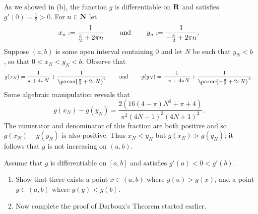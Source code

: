 \documentclass{lew98_solutions}
\begin{document}
\begin{solution}
    As we showed in  (b), the function \( g \) is differentiable on \( \mathbf{R} \) and satisfies \( g'(0) = \tfrac{1}{2} > 0 \). For \( n \in \mathbf{N} \) let
    \[
        x_n := \frac{1}{\tfrac{\pi}{2} + 2 \pi n} \hspace{8mm} \text{and} \hspace{8mm} y_n := \frac{1}{-\tfrac{\pi}{2} + 2 \pi n}.
    \]
    Suppose \( (a, b) \) is some open interval containing 0 and let \( N \) be such that \( y_N < b \), so that \( 0 < x_N < y_N < b \). Observe that
    \[
        g(x_N) = \frac{1}{\pi + 4 \pi N} + \frac{1}{\paren{ \tfrac{\pi}{2} + 2 \pi N }^2} \hspaceand g(y_N) = \frac{1}{-\pi + 4 \pi N} + \frac{1}{\paren{ -\tfrac{\pi}{2} + 2 \pi N }^2}.
    \]
    Some algebraic manipulation reveals that
    \[
        g(x_N) - g(y_N) = \frac{2(16(4 - \pi) N^2 + \pi + 4)}{\pi^2 (4N - 1)^2 (4N + 1)^2}.
    \]
    The numerator and denominator of this fraction are both positive and so \( g(x_N) - g(y_N) \) is also positive. Thus \( x_N < y_N \) but \( g(x_N) > g(y_N) \); it follows that \( g \) is not increasing on \( (a, b) \).
\end{solution}

\begin{exercise}
\label{ex:5.2.11}
    Assume that \( g \) is differentiable on \( [a, b] \) and satisfies \( g'(a) < 0 < g'(b) \).
    \begin{enumerate}
        \item Show that there exists a point \( x \in (a, b) \) where \( g(a) > g(x) \), and a point \( y \in (a, b) \) where \( g(y) < g(b) \).

        \item Now complete the proof of Darboux's Theorem started earlier.
    \end{enumerate}
\end{exercise}
\end{document}
